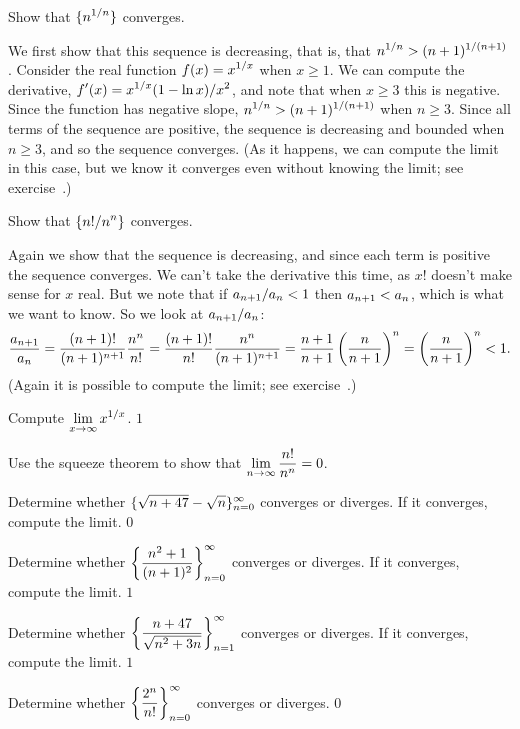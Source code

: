 \example
Show that $\displaystyle\{n^{1/n}\}$ converges. 
\par\nobreak\ssk\noindent
We first show that 
this sequence is decreasing, that is, that $\displaystyle n^{1/n}>
(n+1)^{1/(n+1)}$. Consider the real function $\displaystyle f(x)=x^{1/x}$ when
$x\ge1$. We can compute the derivative, $\displaystyle f'(x)=x^{1/x}(1-\ln x)/x^2$,
and note that when $x\ge 3$ this is negative. Since the function has
negative slope, $\displaystyle n^{1/n}>
(n+1)^{1/(n+1)}$ when $n\ge 3$. Since all terms of the sequence are
positive, the sequence is decreasing and bounded when $n\ge3$, and so
the sequence converges. (As it happens, we can compute the limit in
this case, but we know it converges even without knowing the limit; see
exercise~.)
\endexample

\example
Show that $\displaystyle\{n!/n^n\}$ converges.
\par\nobreak\ssk\noindent
Again we show that the sequence is decreasing, and since each term is
positive the sequence converges. We can't take the derivative this
time, as $x!$ doesn't make sense for $x$ real. But we note that if 
$\displaystyle a_{n+1}/a_n < 1$ then $\displaystyle a_{n+1}< a_n$, which is what we want to
know. So we look at $\displaystyle a_{n+1}/a_n$:
$$ 
  {a_{n+1}\over a_n} = {(n+1)!\over (n+1)^{n+1}}{n^n\over n!}=
  {(n+1)!\over n!}{n^n\over (n+1)^{n+1}}=
  {n+1\over n+1}\left({n\over n+1}\right)^n=
  \left({n\over n+1}\right)^n < 1.
$$
(Again it is possible to compute the limit; see
exercise~.)
\endexample

\exercises

\exercise {}
Compute $\displaystyle\lim_{x\to\infty} x^{1/x}$.
\answer $1$
\endanswer
\endexercise

\exercise Use the squeeze theorem to show that 
$\displaystyle\lim_{n\to\infty} {n!\over n^n}=0$.
\endexercise

\exercise Determine whether $\displaystyle\{\sqrt{n+47}-\sqrt{n}\}_{n=0}^\infty$ 
converges or diverges. If it converges, compute the limit.
\answer $0$
\endanswer
\endexercise

\exercise Determine whether 
$\displaystyle\left\{{n^2+1\over (n+1)^2}\right\}_{n=0}^\infty$ 
converges or diverges. If it converges, compute the limit.
\answer $1$
\endanswer
\endexercise

\exercise Determine whether 
$\displaystyle\left\{{n+47\over\sqrt{n^2+3n}}\right\}_{n=1}^\infty$ 
converges or diverges. If it converges, compute the limit.
\answer $1$
\endanswer
\endexercise

\exercise Determine whether 
$\displaystyle\left\{{2^n\over n!}\right\}_{n=0}^\infty$ 
converges or diverges. 
\answer $0$
\endanswer
\endexercise

\endexercises

